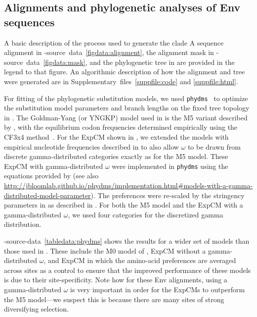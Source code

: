 \documentclass[9pt]{elife}
\begin{document}
\subsection{Alignments and phylogenetic analyses of Env sequences}
A basic description of the process used to generate the clade A sequence alignment in -source~data~\ref{figdata:alignment}, the alignment mask in -source~data~\ref{figdata:mask}, and the phylogenetic tree in  are provided in the legend to that figure.
An algorithmic description of how the alignment and tree were generated are in Supplementary~files~\ref{suppfile:code} and \ref{suppfile:html}.

For fitting of the phylogenetic substitution models, we used \texttt{phydms}~\citep[][\url{http://jbloomlab.github.io/phydms/}, version 2.2.1]{hilton2017phydms} to optimize the substitution model parameters and branch lengths on the fixed tree topology in .
The Goldman-Yang (or YNGKP) model used in  is the M5 variant described by \citet{yang2000codon}, with the equilibrium codon frequencies determined empirically using the CF3x4 method~\citep{pond2010correcting}.
For the ExpCM shown in , we extended the models with empirical nucleotide frequencies described in \citet{hilton2017phydms} to also allow $\omega$ to be drawn from discrete gamma-distributed categories exactly as for the M5 model.
These ExpCM with gamma-distributed $\omega$ were implemented in \texttt{phydms} using the equations provided by \citet{yang1994maximum} (see also \url{http://jbloomlab.github.io/phydms/implementation.html#models-with-a-gamma-distributed-model-parameter}).
The preferences were re-scaled by the stringency parameters in  as described in \citet{hilton2017phydms}.
For both the M5 model and the ExpCM with a gamma-distributed $\omega$, we used four categories for the discretized gamma distribution.

-source-data~\ref{tabledata:phydms} shows the results for a wider set of models than those used in . 
These include the M0 model of \citet{yang2000codon}, ExpCM without a gamma-distributed $\omega$, and ExpCM in which the amino-acid preferences are averaged across sites as a control to ensure that the improved performance of these models is due to their site-specificity.
Note how for these Env alignments, using a gamma-distributed $\omega$ is very important in order for the ExpCMs to outperform the M5 model---we suspect this is because there are many sites of strong diversifying selection.
\end{document}
